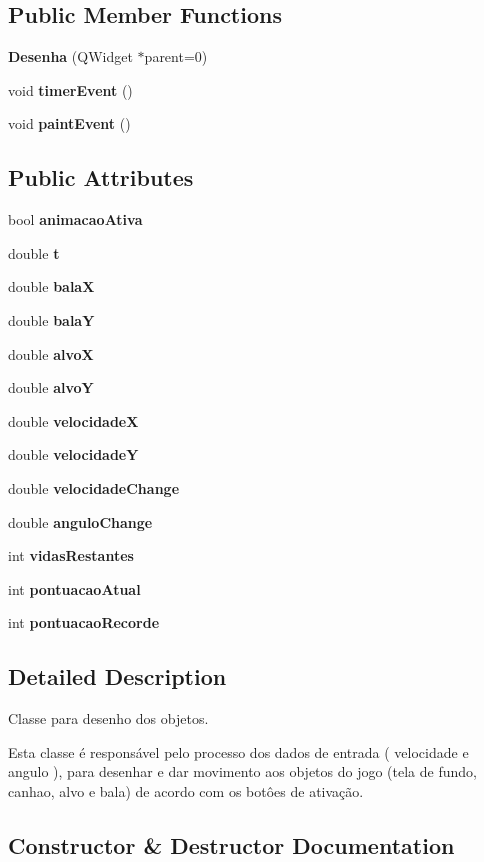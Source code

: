 \subsection*{Public Member Functions}
\begin{DoxyCompactItemize}
\item 
{\bf Desenha} (Q\+Widget $\ast$parent=0)
\item 
void {\bf timer\+Event} ()
\item 
void {\bf paint\+Event} ()
\end{DoxyCompactItemize}
\subsection*{Public Attributes}
\begin{DoxyCompactItemize}
\item 
bool {\bf animacao\+Ativa}
\item 
double {\bf t}
\item 
double {\bf bala\+X}
\item 
double {\bf bala\+Y}
\item 
double {\bf alvo\+X}
\item 
double {\bf alvo\+Y}
\item 
double {\bf velocidade\+X}
\item 
double {\bf velocidade\+Y}
\item 
double {\bf velocidade\+Change}
\item 
double {\bf angulo\+Change}
\item 
int {\bf vidas\+Restantes}
\item 
int {\bf pontuacao\+Atual}
\item 
int {\bf pontuacao\+Recorde}
\end{DoxyCompactItemize}


\subsection{Detailed Description}
Classe para desenho dos objetos. 

Esta classe é responsável pelo processo dos dados de entrada ( velocidade e angulo ), para desenhar e dar movimento aos objetos do jogo (tela de fundo, canhao, alvo e bala) de acordo com os botôes de ativação. 

\subsection{Constructor \& Destructor Documentation}
